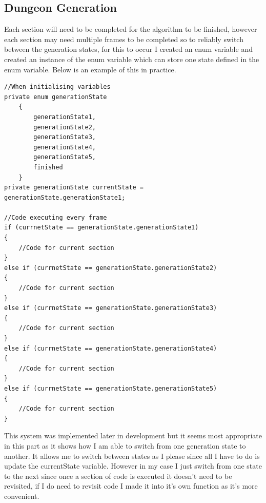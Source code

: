 \documentclass{article}
\begin{document}
\subsection{Dungeon Generation}
Each section will need to be completed for the algorithm to be finished, however each section may need multiple frames to be completed so to reliably switch between the generation states, for this to occur I created an enum variable and created an instance of the enum variable which can store one state defined in the enum variable. Below is an example of this in practice.
\begin{lstlisting}
//When initialising variables
private enum generationState
    {
        generationState1,
        generationState2,
        generationState3,
        generationState4,
        generationState5,
        finished
    }
private generationState currentState = generationState.generationState1;

//Code executing every frame
if (currnetState == generationState.generationState1)
{
	//Code for current section
}
else if (currnetState == generationState.generationState2)
{
	//Code for current section
}
else if (currnetState == generationState.generationState3)
{
	//Code for current section
}
else if (currnetState == generationState.generationState4)
{
	//Code for current section
}
else if (currnetState == generationState.generationState5)
{
	//Code for current section
}
\end{lstlisting}
This system was implemented later in development but it seems most appropriate in this part as it shows how I am able to switch from one generation state to another. It allows me to switch between states as I please since all I have to do is update the currentState variable. However in my case I just switch from one state to the next since once a section of code is executed it doesn't need to be revisited, if I do need to revisit code I made it into it's own function as it's more convenient.
\end{document}
